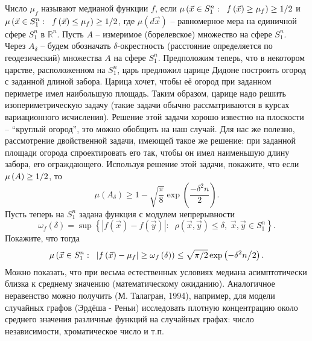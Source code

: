 \begin{problem}
\label{levi}
Число $\mu _f $ называют медианой функции $f$, если
$\mu \left( {\vec {x}\in S_1^n :\;\;f\left( {\vec {x}} \right)\ge \mu _f } 
\right)\ge 1 \mathord{\left/ {\vphantom {1 2}} \right. 
\kern-\nulldelimiterspace} 2$ и $\mu \left( {\vec {x}\in S_1^n :\;\;f\left( 
{\vec {x}} \right)\le \mu _f } \right)\ge 1 \mathord{\left/ {\vphantom {1 
2}} \right. \kern-\nulldelimiterspace} 2$,
где $\mu \left( {d\vec {x}} \right)$ -- равномерное мера на единичной сфере 
$S_1^n $ в ${\mathbb R}^n$. Пусть $A$ -- измеримое (борелевское) множество на 
сфере $S_1^n $. Через $A_\delta $ -- будем обозначать $\delta $-окрестность (расстояние определяется по геодезический)
множества $A$ на сфере $S_1^n $. Предположим теперь, что в некотором 
царстве, расположенном на $S_1^n $, царь предложил царице Дидоне построить 
огород с заданной длиной забора. Царица хочет, чтобы её огород при заданном 
периметре имел наибольшую площадь. Таким образом, царице надо решить 
изопериметрическую задачу (такие задачи обычно рассматриваются в курсах 
вариационного исчисления). Решение этой задачи хорошо известно на плоскости -- ``круглый 
огород'', это можно обобщить на наш случай. Для нас же полезно, рассмотрение двойственной задачи, имеющей 
такое же решение: при заданной площади огорода спроектировать его так, чтобы 
он имел наименьшую длину забора, его ограждающего. Используя решение этой 
задачи, покажите, что если $\mu \left( A \right)\ge 1 \mathord{\left/ 
{\vphantom {1 2}} \right. \kern-\nulldelimiterspace} 2$, то
$$
\mu \left( {A_\delta } \right)\ge 1-\sqrt {\frac{\pi}{8}} \exp \left( \frac{-\delta^2n}{2} \right).
$$
Пусть теперь на $S_1^n $ задана функция с модулем непрерывности
\[
\omega _f \left( \delta \right)=\sup \left\{ {\left| {f\left( {\vec {x}} 
\right)-f\left( {\vec {y}} \right)} \right|:\;\;\rho \left( {\vec {x},\vec 
{y}} \right)\le \delta ,\;\vec {x},\vec {y}\in S_1^n } \right\}.
\]
Покажите, что тогда
\[
\mu \left( {\vec {x}\in S_1^n :\;\;\left| {f\left( {\vec {x}} \right)-\mu _f 
} \right|\ge \omega _f \left( \delta \right)} \right)\le \sqrt {\pi 
\mathord{\left/ {\vphantom {\pi 2}} \right. \kern-\nulldelimiterspace} 2} 
\exp \left( {-{\delta ^2n} \mathord{\left/ {\vphantom {{\delta ^2n} 2}} 
\right. \kern-\nulldelimiterspace} 2} \right).
\]
Можно показать, что при весьма естественных условиях медиана асимптотически 
близка к среднему значению (математическому ожиданию). Аналогичное 
неравенство можно получить (М. Талагран, 1994), например, для модели 
случайных графов (Эрдёша - Реньи) исследовать плотную концентрацию около 
среднего значения различные функций на случайных графах: число 
независимости, хроматическое число и т.п.
\end{problem}


